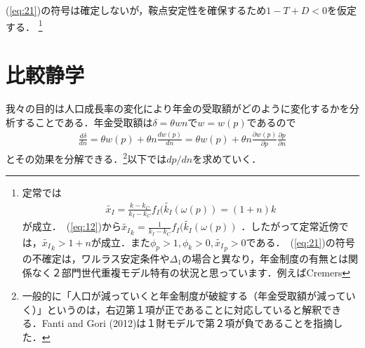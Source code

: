 \documentclass[12pt,a4paper]{jsarticle}
\begin{document}
(\ref{eq:21})の符号は確定しないが，鞍点安定性を確保するため$1-T+D<0$を仮定する．%
\footnote{ \label{fn:1}
定常では
\begin{align}
 \tilde{x_{I}} = \frac{k -k_{C}}{k_{I}-k_{C}} f_{I}(\tilde{k_{I}}(\omega(p)) = (1+n) k
\end{align}
が成立．~(\ref{eq:12})から$\tilde{x_{I}}_{k}= \frac{1}{k_{I}-k_{C}} f_{I}(\tilde{k_{I}}(\omega(p))$ ．したがって定常近傍では，$ \tilde{x_{I}}_{k} >1+n$が成立．また$\phi_{p}>1, \phi_{k}>0, \tilde{x_{I}}_{p}>0$である．~(\ref{eq:21})の符号の不確定は，ワルラス安定条件や$\Delta_{1}$の場合と異なり，年金制度の有無とは関係なく２部門世代重複モデル特有の状況と思っています．例えばCremers
}
\section{比較静学}

我々の目的は人口成長率の変化により年金の受取額がどのように変化するかを分析することである．年金受取額は$\delta = \theta w n$で$w=w(p)$であるので
\begin{align}
 \frac{d \delta}{dn} = \theta w(p) + \theta n \frac{d w(p)}{d n} =  \theta w(p) + \theta n \frac{\partial w(p)}{\partial p} \frac{\partial p}{\partial n} \label{eq:23}
\end{align}
とその効果を分解できる．\<\footnote{
一般的に「人口が減っていくと年金制度が破綻する（年金受取額が減っていく）」というのは，右辺第１項が正であることに対応していると解釈できる．Fanti and Gori (2012)は１財モデルで第２項が負であることを指摘した．}以下では$dp/dn$を求めていく．
\end{document}
